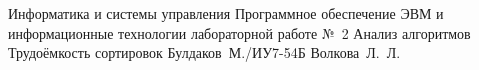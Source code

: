 \documentclass{bmstu}[a4paper]
\begin{document}
\makereporttitle
{Информатика и системы управления} %
{Программное обеспечение ЭВМ и информационные технологии} %
{лабораторной работе №~2} %
{Анализ алгоритмов} %
{Трудоёмкость сортировок} %
{} %
{Булдаков~М./ИУ7-54Б} %
{Волкова~Л.~Л.} %

\maketableofcontents





%
%


\makebibliography

%
\end{document}
